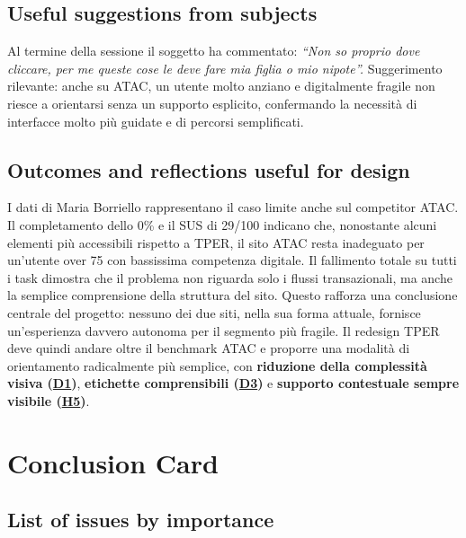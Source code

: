 ﻿\documentclass[11pt,a4paper]{article}
\begin{document}
\subsection*{Useful suggestions from subjects}
\begin{tcolorbox}[base]
Al termine della sessione il soggetto ha commentato:
\textit{``Non so proprio dove cliccare, per me queste cose le deve fare mia figlia o mio nipote''.}
Suggerimento rilevante: anche su ATAC, un utente molto anziano e digitalmente fragile non riesce a orientarsi senza un supporto esplicito, confermando la necessità di interfacce molto più guidate e di percorsi semplificati.
\end{tcolorbox}

\subsection*{Outcomes and reflections useful for design}
\begin{tcolorbox}[base]
I dati di Maria Borriello rappresentano il caso limite anche sul competitor ATAC. Il completamento dello 0\% e il SUS di 29/100 indicano che, nonostante alcuni elementi più accessibili rispetto a TPER, il sito ATAC resta inadeguato per un'utente over 75 con bassissima competenza digitale. Il fallimento totale su tutti i task dimostra che il problema non riguarda solo i flussi transazionali, ma anche la semplice comprensione della struttura del sito. Questo rafforza una conclusione centrale del progetto: nessuno dei due siti, nella sua forma attuale, fornisce un'esperienza davvero autonoma per il segmento più fragile. Il redesign TPER deve quindi andare oltre il benchmark ATAC e proporre una modalità di orientamento radicalmente più semplice, con \textbf{riduzione della complessità visiva (\hyperref[atac:D1]{D1})}, \textbf{etichette comprensibili (\hyperref[atac:D3]{D3})} e \textbf{supporto contestuale sempre visibile (\hyperref[atac:H5]{H5})}.
\end{tcolorbox}



\newpage

\section{Conclusion Card}

\subsection*{List of issues by importance}
\end{document}
